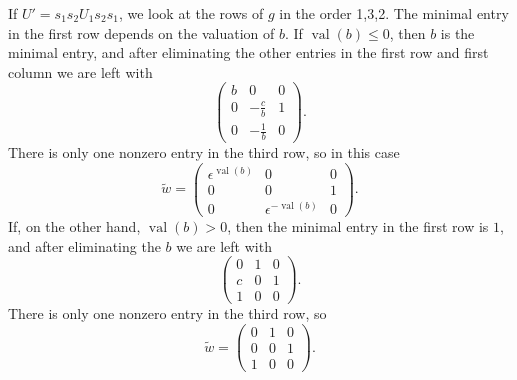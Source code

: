 \documentclass{amsart}
\theoremstyle{definition}
\def\e{\epsilon}
\def\w{\widetilde{w}}
\def\val{\mathop{\mathrm{val}}}
\begin{document}
  If $U' = s_1s_2 U_1 s_2s_1$, we look at the rows of $g$ in the order 1,3,2.
  The minimal entry in the first row depends on the valuation of $b$.  If
  $\val(b) \le 0$, then $b$ is the minimal entry, and after eliminating the
  other entries in the first row and first column we are left with
  \begin{equation}\label{eq:w5-row1-b-le-zero}
    \begin{pmatrix}
      b & 0 & 0 \\
      0 & -\frac{c}{b} & 1 \\
      0& -\frac{1}{b} & 0
    \end{pmatrix}.
  \end{equation}
  There is only one nonzero entry in the third row, so in this case
  \begin{equation*}
    \w = \begin{pmatrix}
      \e^{\val(b)} & 0 & 0 \\
      0 & 0 & 1 \\
      0 & \e^{-\val(b)} & 0
    \end{pmatrix}.
  \end{equation*}
  If, on the other hand, $\val(b) > 0$, then the minimal entry in the first row
  is $1$, and after eliminating the $b$ we are left with
  \begin{equation}\label{eq:w5-row1-b-greater-zero}
    \begin{pmatrix}
      0 & 1 & 0 \\
      c & 0 & 1 \\
      1 & 0 & 0
    \end{pmatrix}.
  \end{equation}
  There is only one nonzero entry in the third row, so 
  \begin{equation*}
    \w = \begin{pmatrix}
      0 & 1 & 0 \\
      0 & 0 & 1 \\
      1 & 0 & 0
    \end{pmatrix}.
  \end{equation*}
\end{document}
